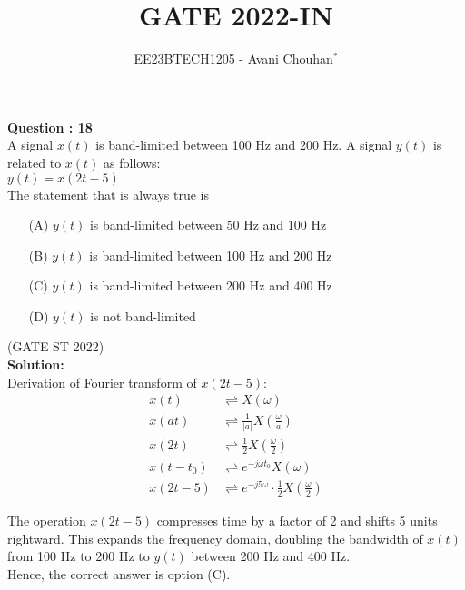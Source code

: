 \documentclass[journal,12pt,twocolumn]{IEEEtran}
\theoremstyle{remark}
\begin{document}

\vspace{3cm}

\title{GATE 2022-IN}
\author{EE23BTECH1205 - Avani Chouhan$^{*}$}
\maketitle
\newpage
\bigskip

\renewcommand{\thefigure}{\theenumi}
\renewcommand{\thetable}{\theenumi}

\vspace{3cm}
\textbf{Question : 18} \\
A signal \( x(t) \) is band-limited between 100 Hz and 200 Hz. A signal \( y(t) \) is related to \( x(t) \) as follows:\\

\( y(t) = x(2t - 5) \)\\
The statement that is always true is \\

\begin{enumerate}
  \item[(A)] \( y(t) \) is band-limited between 50 Hz and 100 Hz
  \item[(B)] \( y(t) \) is band-limited between 100 Hz and 200 Hz
  \item[(C)] \( y(t) \) is band-limited between 200 Hz and 400 Hz
  \item[(D)] \( y(t) \) is not band-limited 
\end{enumerate}

\hfill{(GATE ST 2022)}\\
\textbf{Solution:} \\

Derivation of Fourier transform of \(x(2t-5)\):
\begin{align}
x(t) &\rightleftharpoons X(\omega) \label{eq1}\\
x(at) &\rightleftharpoons \frac{1}{|a|} X\left(\frac{\omega}{a}\right) \label{eq2}\\
x(2t) &\rightleftharpoons \frac{1}{2} X\left(\frac{\omega}{2}\right) \label{eq3}\\
x(t - t_0) &\rightleftharpoons e^{-j\omega t_0}X(\omega) \label{eq4}\\
x(2t - 5) &\rightleftharpoons e^{-j5\omega} \cdot \frac{1}{2} X\left(\frac{\omega}{2}\right) \label{eq5}
\end{align}

The operation \(x(2t-5)\) compresses time by a factor of 2 and shifts 5 units rightward. This expands the frequency domain, doubling the bandwidth of \(x(t)\) from 100 Hz to 200 Hz to \(y(t)\) between 200 Hz and 400 Hz.\\

Hence, the correct answer is option (C).
\end{document}
